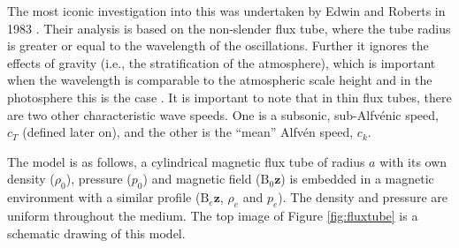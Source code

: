     The most iconic investigation into this was undertaken by Edwin and Roberts in 1983 \citep{WPMC}.
    Their analysis is based on the non-slender flux tube, where the tube radius is greater or equal to the wavelength of the oscillations.
    Further it ignores the effects of gravity (i.e., the stratification of the atmosphere), which is important when the wavelength is comparable to the atmospheric scale height and in the photosphere this is the case \citep{LNLMHD}. 
    It is important to note that in thin flux tubes, there are two other characteristic wave speeds.
    One is a subsonic, sub-Alfv\'{e}nic speed, $c_T$ (defined later on), and the other is the ``mean'' Alfv\'{e}n speed, $c_k$.

    The model is as follows, a cylindrical magnetic flux tube of radius $a$ with its own density ($\rho_0$), pressure ($p_0$) and magnetic field ($\mathrm{B}_0\textbf{\^{z}}$) is embedded in a magnetic environment with a similar profile ($\mathrm{B}_e \textbf{\^{z}}$, $\rho_e$ and $p_e$).   
    The density and pressure are uniform throughout the medium.
    The top image of Figure \ref{fig:fluxtube} is a schematic drawing of this model. 
        
